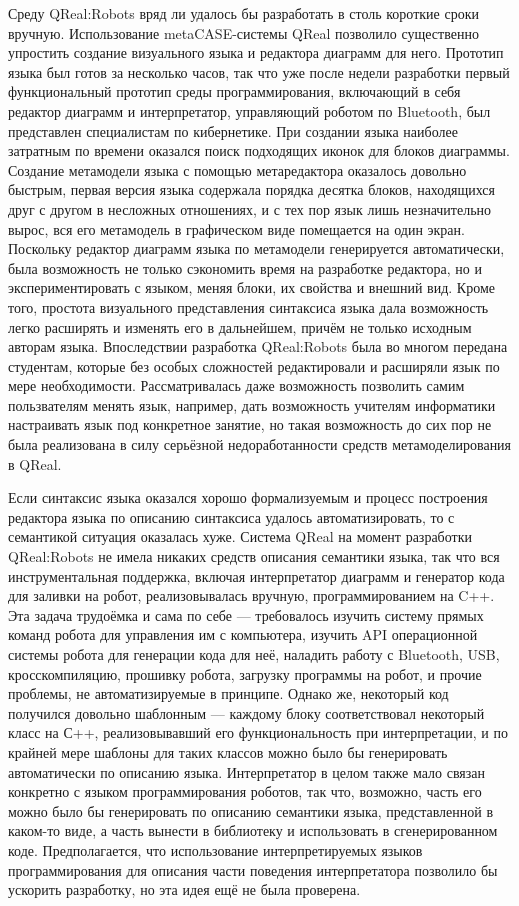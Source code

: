 \documentclass[a4paper]{article}
\begin{document}
Среду QReal:Robots вряд ли удалось бы разработать в столь короткие сроки вручную. Использование metaCASE-системы QReal позволило существенно упростить создание визуального языка и редактора диаграмм для него. Прототип языка был готов за несколько часов, так что уже после недели разработки первый функциональный прототип среды программирования, включающий в себя редактор диаграмм и интерпретатор, управляющий роботом по Bluetooth, был представлен специалистам по кибернетике. При создании языка наиболее затратным по времени оказался поиск подходящих иконок для блоков диаграммы. Создание метамодели языка с помощью метаредактора оказалось довольно быстрым, первая версия языка содержала порядка десятка блоков, находящихся друг с другом в несложных отношениях, и с тех пор язык лишь незначительно вырос, вся его метамодель в графическом виде помещается на один экран. Поскольку редактор диаграмм языка по метамодели генерируется автоматически, была возможность не только сэкономить время на разработке редактора, но и экспериментировать с языком, меняя блоки, их свойства и внешний вид. Кроме того, простота визуального представления синтаксиса языка дала возможность легко расширять и изменять его в дальнейшем, причём не только исходным авторам языка. Впоследствии разработка QReal:Robots была во многом передана студентам, которые без особых сложностей редактировали и расширяли язык по мере необходимости. Рассматривалась даже возможность позволить самим пользвателям менять язык, например, дать возможность учителям информатики настраивать язык под конкретное занятие, но такая возможность до сих пор не была реализована в силу серьёзной недоработанности средств метамоделирования в QReal.

Если синтаксис языка оказался хорошо формализуемым и процесс построения редактора языка по описанию синтаксиса удалось автоматизировать, то с семантикой ситуация оказалась хуже. Система QReal на момент разработки QReal:Robots не имела никаких средств описания семантики языка, так что вся инструментальная поддержка, включая интерпретатор диаграмм и генератор кода для заливки на робот, реализовывалась вручную, программированием на C++. Эта задача трудоёмка и сама по себе --- требовалось изучить систему прямых команд робота для управления им с компьютера, изучить API операционной системы робота для генерации кода для неё, наладить работу с Bluetooth, USB, кросскомпиляцию, прошивку робота, загрузку программы на робот, и прочие проблемы, не автоматизируемые в принципе. Однако же, некоторый код получился довольно шаблонным --- каждому блоку соответствовал некоторый класс на С++, реализовывавший его функциональность при интерпретации, и по крайней мере шаблоны для таких классов можно было бы генерировать автоматически по описанию языка. Интерпретатор в целом также мало связан конкретно с языком программирования роботов, так что, возможно, часть его можно было бы генерировать по описанию семантики языка, представленной в каком-то виде, а часть вынести в библиотеку и использовать в сгенерированном коде. Предполагается, что использование интерпретируемых языков программирования для описания части поведения интерпретатора позволило бы ускорить разработку, но эта идея ещё не была проверена.
\end{document}

